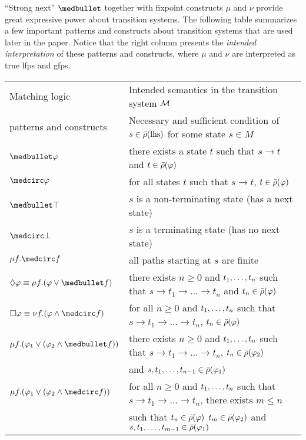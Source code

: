 \documentclass{amsart}
\begin{document}
``Strong next'' $\snext$ together with fixpoint constructs $\mu$ and $\nu$
provide great expressive power about transition systems.
The following table summarizes a few important patterns and constructs about
transition systems
that are used later in the paper.
Notice that the right column presents the \emph{intended interpretation} of
these
patterns and constructs, where $\mu$ and $\nu$ are interpreted as true lfps and
gfps.
\begin{center}
	\small
	\begin{tabular}{ll}
		Matching logic          &  Intended semantics in the transition system $\mathcal{M}$ \\
		patterns and constructs & Necessary and sufficient condition of $s \in
		\bar{\rho}(\text{lhs})$
		for some state $s \in M$
		\\\hline
		$\snext \varphi$ &
		there exists a state $t$ such that $s \to t$ and $t \in \bar{\rho}(\varphi)$
		\\
		$\wnext \varphi$ &
		for all states $t$ such that $s \to t$, $t \in \bar{\rho}(\varphi)$
		\\
		$\snext \top$ &
		$s$ is a non-terminating state (has a next state)
		\\
		$\wnext \bot$ &
		$s$ is a terminating state (has no next state)
		\\
		$\mu f . \wnext f$ &
		all paths starting at $s$ are finite 
		\\
		$\eventually \varphi \equiv \mu f . (\varphi \vee \snext f)$ &
		there exists $n \ge 0$ and $t_1 ,\dots, t_n$ such that 
		$s \to t_1 \to \dots \to t_n$ and $t_n \in \bar{\rho}(\varphi)$
		\\
		$\always \varphi \equiv \nu f . (\varphi \wedge \wnext f)$ &
		for all $n \ge 0$ and $t_1 ,\dots, t_n$ such that
		$s \to t_1 \to \dots \to t_n$, $t_n \in \bar{\rho}(\varphi)$
		\\
		$\mu f . (\varphi_1 \vee (\varphi_2 \wedge \snext f))$ &
		there exists $n \ge 0$ and $t_1 ,\dots, t_n$ such that 
		$s \to t_1 \to \dots \to t_n$, 
		$t_n \in \bar{\rho}(\varphi_2)$
		\\& and $s,t_1 ,\dots, t_{n-1} \in \bar{\rho}(\varphi_1)$
		\\
		$\mu f . (\varphi_1 \vee (\varphi_2 \wedge \wnext f))$ &
		for all $n \ge 0$ and $t_1 ,\dots, t_n$ such that
		$s \to t_1 \to \dots \to t_n$, 
		there exists $m \le n$ 
		\\&such that $t_n \in \bar{\rho}(\varphi)$
		$t_m \in \bar{\rho}(\varphi_2)$ and $s,t_1 ,\dots, t_{m-1} \in \bar{\rho}(\varphi_1)$
	\end{tabular}
\end{center}
\end{document}

